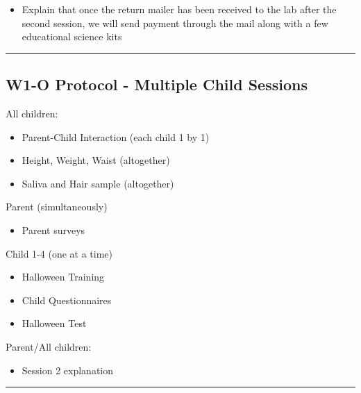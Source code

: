 \documentclass[]{book}
\providecommand{\tightlist}{%
  \setlength{\itemsep}{0pt}\setlength{\parskip}{0pt}}
\begin{document}
\begin{itemize}
  \begin{itemize}
  \tightlist
  \item
    Explain that once the return mailer has been received to the lab after the second session, we will send payment through the mail along with a few educational science kits
  \end{itemize}
\end{itemize}

\begin{center}\rule{0.5\linewidth}{0.5pt}\end{center}

\hypertarget{w1-o-protocol---multiple-child-sessions}{%
\subsection{W1-O Protocol - Multiple Child Sessions}\label{w1-o-protocol---multiple-child-sessions}}

All children:

\begin{itemize}
\tightlist
\item
  Parent-Child Interaction (each child 1 by 1)
\item
  Height, Weight, Waist (altogether)
\item
  Saliva and Hair sample (altogether)
\end{itemize}

Parent (simultaneously)

\begin{itemize}
\tightlist
\item
  Parent surveys
\end{itemize}

Child 1-4 (one at a time)

\begin{itemize}
\tightlist
\item
  Halloween Training
\item
  Child Questionnaires
\item
  Halloween Test
\end{itemize}

Parent/All children:

\begin{itemize}
\tightlist
\item
  Session 2 explanation
\end{itemize}

\begin{center}\rule{0.5\linewidth}{0.5pt}\end{center}
\end{document}
